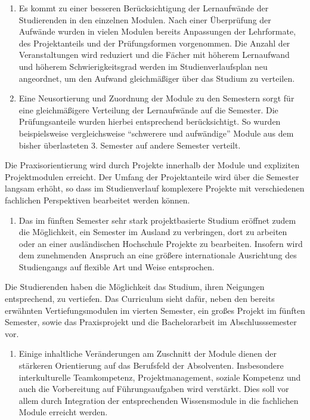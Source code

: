 \begin{enumerate}
\def\labelenumi{\arabic{enumi}.}
\tightlist
\item
  Es kommt zu einer besseren Berücksichtigung der Lernaufwände der
  Studierenden in den einzelnen Modulen. Nach einer Überprüfung der
  Aufwände wurden in vielen Modulen bereits Anpassungen der Lehrformate,
  des Projektanteils und der Prüfungsformen vorgenommen. Die Anzahl der
  Veranstaltungen wird reduziert und die Fächer mit höherem Lernaufwand
  und höherem Schwierigkeitsgrad werden im Studienverlaufsplan neu
  angeordnet, um den Aufwand gleichmäßiger über das Studium zu
  verteilen.
\item
  Eine Neusortierung und Zuordnung der Module zu den Semestern sorgt für
  eine gleichmäßigere Verteilung der Lernaufwände auf die Semester. Die
  Prüfungsanteile wurden hierbei entsprechend berücksichtigt. So wurden
  beispielsweise vergleichsweise ``schwerere und aufwändige'' Module aus
  dem bisher überlasteten 3. Semester auf andere Semester verteilt.
\end{enumerate}

Die Praxisorientierung wird durch Projekte innerhalb der Module und
expliziten Projektmodulen erreicht. Der Umfang der Projektanteile wird
über die Semester langsam erhöht, so dass im Studienverlauf komplexere
Projekte mit verschiedenen fachlichen Perspektiven bearbeitet werden
können.

\begin{enumerate}
\def\labelenumi{\arabic{enumi}.}
\setcounter{enumi}{2}
\tightlist
\item
  Das im fünften Semester sehr stark projektbasierte Studium eröffnet
  zudem die Möglichkeit, ein Semester im Ausland zu verbringen, dort zu
  arbeiten oder an einer ausländischen Hochschule Projekte zu
  bearbeiten. Insofern wird dem zunehmenden Anspruch an eine größere
  internationale Ausrichtung des Studiengangs auf flexible Art und Weise
  entsprochen.
\end{enumerate}

Die Studierenden haben die Möglichkeit das Studium, ihren Neigungen
entsprechend, zu vertiefen. Das Curriculum sieht dafür, neben den
bereits erwähnten Vertiefungsmodulen im vierten Semester, ein großes
Projekt im fünften Semester, sowie das Praxisprojekt und die
Bachelorarbeit im Abschlusssemester vor.

\begin{enumerate}
\def\labelenumi{\arabic{enumi}.}
\setcounter{enumi}{3}
\tightlist
\item
  Einige inhaltliche Veränderungen am Zuschnitt der Module dienen der
  stärkeren Orientierung auf das Berufsfeld der Absolventen.
  Insbesondere interkulturelle Teamkompetenz, Projektmanagement, soziale
  Kompetenz und auch die Vorbereitung auf Führungsaufgaben wird
  verstärkt. Dies soll vor allem durch Integration der entsprechenden
  Wissensmodule in die fachlichen Module erreicht werden.
\end{enumerate}

